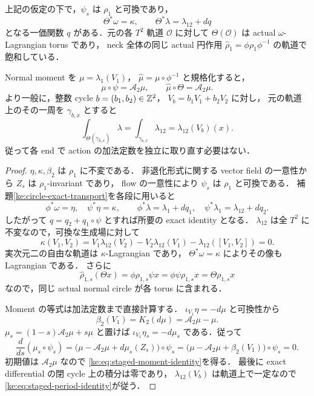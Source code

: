 \begin{theorem}
\label{ke:staged-neck-averaging}
上記の仮定の下で，$\psi_s$ は $\rho_1$ と可換であり，
\[
 \Theta^*\omega=\kappa,\qquad
 \Theta^*\lambda=\lambda_{12}+dq
\]
となる一価関数 $q$ がある．元の各 $T^2$ 軌道 $\mathcal O$ に対して
$\Theta(\mathcal O)$ は actual $\omega$-Lagrangian torus であり，
neck 全体の同じ actual 円作用
$\widehat\rho_1=\phi\rho_1\phi^{-1}$ の軌道で飽和している．

Normal moment を
$\mu=\lambda_1(V_1)$，
$\widehat\mu=\mu\circ\phi^{-1}$ と規格化すると，
\begin{equation}\label{ke:eq:staged-moment-identity}
 \mu\circ\psi=\mathcal A_2\mu,\qquad
 \widehat\mu\circ\Theta=\mathcal A_2\mu.
\end{equation}
より一般に，整数 cycle $b=(b_1,b_2)\in\mathbb Z^2$，
$V_b=b_1V_1+b_2V_2$ に対し，
元の軌道上のその一周を $\gamma_{b,x}$ とすると
\begin{equation}\label{ke:eq:staged-period-identity}
 \int_{\Theta(\gamma_{b,x})}\lambda
 =\int_{\gamma_{b,x}}\lambda_{12}
 =\lambda_{12}(V_b)(x).
\end{equation}
従って各 end で action の加法定数を独立に取り直す必要はない．
\end{theorem}
\begin{proof}
$\eta,\kappa,\beta_2$ は $\rho_1$ に不変である．
非退化形式に関する vector field の一意性から $Z_s$ は $\rho_1$-invariant であり，
flow の一意性により $\psi_s$ は $\rho_1$ と可換である．
補題\ref{ke:circle-exact-transport}を各段に用いると
\[
 \phi^*\omega=\eta,\quad \psi^*\eta=\kappa,\qquad
 \phi^*\lambda=\lambda_1+dq_1,\quad
 \psi^*\lambda_1=\lambda_{12}+dq_2.
\]
したがって $q=q_2+q_1\circ\psi$ とすれば所要の exact identity となる．
$\lambda_{12}$ は全 $T^2$ に不変なので，可換な生成場に対して
\[
 \kappa(V_1,V_2)
 =V_1\lambda_{12}(V_2)-V_2\lambda_{12}(V_1)
     -\lambda_{12}([V_1,V_2])=0.
\]
実次元二の自由な軌道は $\kappa$-Lagrangian であり，
$\Theta^*\omega=\kappa$ によりその像も Lagrangian である．
さらに
\[
 \widehat\rho_{1,s}(\Theta x)
 =\phi\rho_{1,s}\psi x
 =\phi\psi\rho_{1,s}x
 =\Theta\rho_{1,s}x
\]
なので，同じ actual normal circle が各 torus に含まれる．

Moment の等式は加法定数まで直接計算する．
$\iota_{V_1}\eta=-d\mu$ と可換性から
\[
 \beta_2(V_1)=K_2(d\mu)=\mathcal A_2\mu-\mu.
\]
$\mu_s=(1-s)\mathcal A_2\mu+s\mu$ と置けば
$\iota_{V_1}\eta_s=-d\mu_s$ である．従って
\[
 \frac d{ds}(\mu_s\circ\psi_s)
 =\bigl(\mu-\mathcal A_2\mu+d\mu_s(Z_s)\bigr)\circ\psi_s
 =\bigl(\mu-\mathcal A_2\mu+\beta_2(V_1)\bigr)\circ\psi_s=0.
\]
初期値は $\mathcal A_2\mu$ なので
\eqref{ke:eq:staged-moment-identity}を得る．
最後に exact differential の閉 cycle 上の積分は零であり，
$\lambda_{12}(V_b)$ は軌道上で一定なので
\eqref{ke:eq:staged-period-identity}が従う．
\end{proof}

